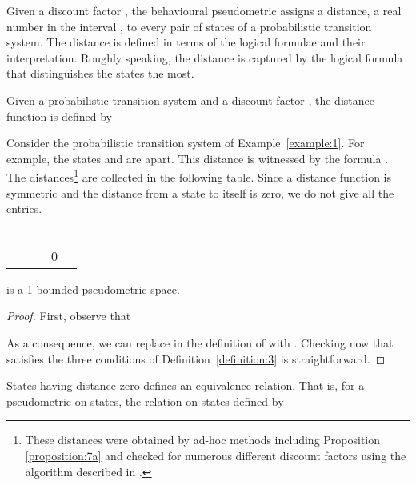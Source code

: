 \documentclass{LMCS}
\begin{document}
Given a discount factor , the behavioural pseudometric
 assigns a distance, a real number in the interval ,
to every pair of states of a probabilistic transition system.  The distance
is defined in terms of the logical formulae and their interpretation.
Roughly speaking, the distance is captured by the logical formula that
distinguishes the states the most.

\begin{defi}
Given a probabilistic transition system  and 
a discount factor ,
the distance function  is defined by

\end{defi}

\begin{exa}
Consider the probabilistic transition system of Example~\ref{example:1}.
For example, the states  and  are  apart.  This
distance is witnessed by the formula .
The distances\footnote{These distances were obtained by ad-hoc methods including
  Proposition \ref{proposition:7a} and checked for numerous different
  discount factors using the algorithm described in \cite{BW06:tcs}.}
are collected in the following table.  Since a distance function is
symmetric and the distance from a state to itself is zero, we do not
give all the entries.
\begin{center}
\begin{tabular}{l|p{8em}p{8em}p{8em}p{8em}}
      &     &     &     & \\
\hline
 &  \\
 &  &  & \\
 &  &  &  & \\
 &  &  & 0        & 
\end{tabular}
\end{center}
\end{exa}

\begin{prop}
\label{proposition:1}
 is a 1-bounded pseudometric space.
\end{prop}
\begin{proof}
First, observe that

As a consequence, we can replace 
 in
the definition of  with
.
Checking now that  satisfies the three conditions of
Definition~\ref{definition:3} is straightforward.
\end{proof}

States having distance zero defines an equivalence relation.  That is,
for a pseudometric  on states, the relation  on states 
defined by
\end{document}
